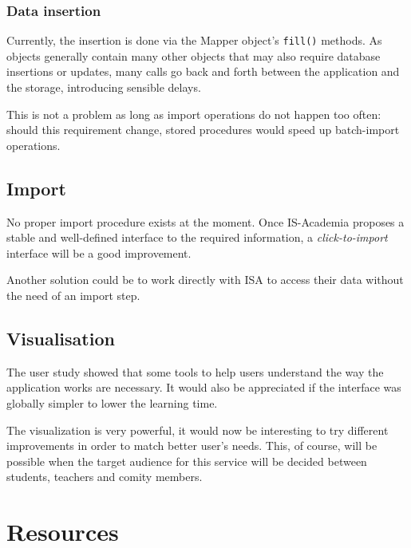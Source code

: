 \subsection{Data insertion}
Currently, the insertion is done via the Mapper object's \verb|fill()| methods. As objects generally contain many other objects that may also require database insertions or updates, many calls go back and forth between the application and the storage, introducing sensible delays.

This is not a problem as long as import operations do not happen too often: should this requirement change, stored procedures would speed up batch-import operations.

\section{Import}
No proper import procedure exists at the moment. Once IS-Academia proposes a stable and well-defined interface to the required information, a \emph{click-to-import} interface will be a good improvement. 

Another solution could be to work directly with ISA to access their data without the need of an import step.

\section{Visualisation}
The user study showed that some tools to help users understand the way the application works are necessary. It would also be appreciated if the interface was globally simpler to lower the learning time. 

The visualization is very powerful, it would now be interesting to try different improvements in order to match better user's needs. This, of course, will be possible when the target audience for this service will be decided between students, teachers and comity members. 


\chapter{Resources}

